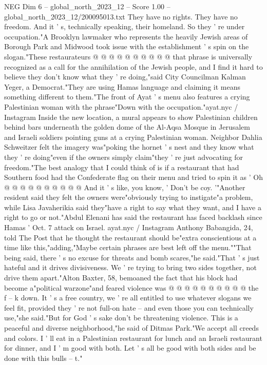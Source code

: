 \begin{textsample}{NEG Dim 6 – global\_north\_2023\_12 – Score 1.00 – global\_north\_2023\_12/200095013.txt}
They have no rights.
They have no freedom.
And it ' s, technically speaking, their homeland.
So they ' re under occupation."A Brooklyn lawmaker who represents the heavily Jewish areas of Borough Park and Midwood took issue with the establishment ' s spin on the slogan."These restaurateurs @ @ @ @ @ @ @ @ @ @ that phrase is universally recognized as a call for the annihilation of the Jewish people, and I find it hard to believe they don't know what they ' re doing,"said City Councilman Kalman Yeger, a Democrat."They are using Hamas language and claiming it means something different to them."The front of Ayat ' s menu also features a crying Palestinian woman with the phrase"Down with the occupation."ayat.nyc / Instagram Inside the new location, a mural appears to show Palestinian children behind bars underneath the golden dome of the Al-Aqsa Mosque in Jerusalem and Israeli soldiers pointing guns at a crying Palestinian woman.
Neighbor Dahlia Schweitzer felt the imagery was"poking the hornet ' s nest and they know what they ' re doing"even if the owners simply claim"they ' re just advocating for freedom."The best analogy that I could think of is if a restaurant that had Southern food had the Confederate flag on their menu and tried to spin it as ' Oh @ @ @ @ @ @ @ @ @ @ And it ' s like, you know, ' Don't be coy. '"Another resident said they felt the owners were"obviously trying to instigate"a problem, while Lisa Javaherikia said they"have a right to say what they want, and I have a right to go or not."Abdul Elenani has said the restaurant has faced backlash since Hamas ' Oct. 7 attack on Israel. ayat.nyc / Instagram Anthony Babangida, 24, told The Post that he thought the restaurant should be"extra conscientious at a time like this,"adding,"Maybe certain phrases are best left off the menu.""That being said, there ' s no excuse for threats and bomb scares,"he said."That ' s just hateful and it drives divisiveness.
We ' re trying to bring two sides together, not drive them apart."Alton Baxter, 58, bemoaned the fact that his block had become a"political warzone"and feared violence was @ @ @ @ @ @ @ @ @ @ the f -- k down.
It ' s a free country, we ' re all entitled to use whatever slogans we feel fit, provided they ' re not full-on hate -- and even those you can technically use,"she said."But for God ' s sake don't be threatening violence.
This is a peaceful and diverse neighborhood,"he said of Ditmas Park."We accept all creeds and colors.
I ' ll eat in a Palestinian restaurant for lunch and an Israeli restaurant for dinner, and I ' m good with both.
Let ' s all be good with both sides and be done with this bulls -- t."

\end{textsample}
